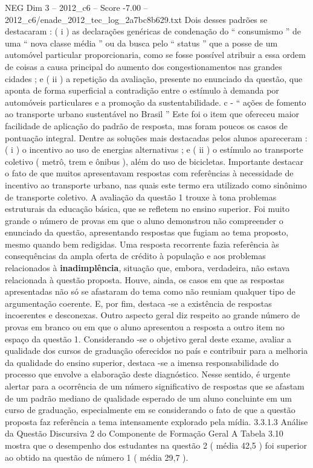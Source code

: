 \begin{textsample}{NEG Dim 3 – 2012\_c6 – Score -7.00 – 2012\_c6/enade\_2012\_tec\_log\_2a7bc8b629.txt}
Dois desses padrões se destacaram : ( i ) as declarações genéricas de condenação do “ consumismo ” de uma “ nova classe média ” ou da busca pelo “ status ” que a posse de um automóvel particular proporcionaria, como se fosse possível atribuir a essa ordem de coisas a causa principal do aumento dos congestionamentos nas grandes cidades ; e ( ii ) a repetição da avaliação, presente no enunciado da questão, que aponta de forma superficial a contradição entre o estímulo à demanda por automóveis particulares e a promoção da sustentabilidade. c - “ ações de fomento ao transporte urbano sustentável no Brasil ” Este foi o item que ofereceu maior facilidade de aplicação do padrão de resposta, mas foram poucos os casos de pontuação integral.
Dentre as soluções mais destacadas pelos alunos apareceram : ( i ) o incentivo ao uso de energias alternativas ; e ( ii ) o estímulo ao transporte coletivo ( metrô, trem e ônibus ), além do uso de bicicletas.
Importante destacar o fato de que muitos apresentavam respostas com referências à necessidade de incentivo ao transporte urbano, nas quais este termo era utilizado como sinônimo de transporte coletivo.
A avaliação da questão 1 trouxe à tona problemas estruturais da educação básica, que se refletem no ensino superior.
Foi muito grande o número de provas em que o aluno demonstrou não compreender o enunciado da questão, apresentando respostas que fugiam ao tema proposto, mesmo quando bem redigidas.
Uma resposta recorrente fazia referência às consequências da ampla oferta de crédito à população e aos problemas relacionados à \textbf{inadimplência}, situação que, embora, verdadeira, não estava relacionada à questão proposta.
Houve, ainda, os casos em que as respostas apresentadas não só se afastaram do tema como não reuniam qualquer tipo de argumentação coerente.
E, por fim, destaca -se a existência de respostas incoerentes e desconexas.
Outro aspecto geral diz respeito ao grande número de provas em branco ou em que o aluno apresentou a resposta a outro item no espaço da questão 1.
Considerando -se o objetivo geral deste exame, avaliar a qualidade dos cursos de graduação oferecidos no país e contribuir para a melhoria da qualidade do ensino superior, destaca -se a imensa responsabilidade do processo que envolve a elaboração deste diagnóstico.
Nesse sentido, é urgente alertar para a ocorrência de um número significativo de respostas que se afastam de um padrão mediano de qualidade esperado de um aluno concluinte em um curso de graduação, especialmente em se considerando o fato de que a questão proposta faz referência a tema intensamente explorado pela mídia. 3.3.1.3 Análise da Questão Discursiva 2 do Componente de Formação Geral A Tabela 3.10 mostra que o desempenho dos estudantes na questão 2 ( média 42,5 ) foi superior ao obtido na questão de número 1 ( média 29,7 ).

\end{textsample}

